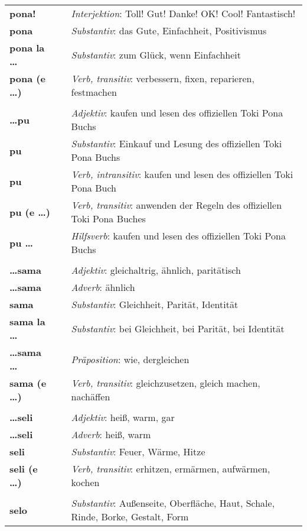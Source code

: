 \begin{supertabular}{p{2,5cm}|ll}
\textbf{pona!} && \textit{Interjektion}: Toll! Gut! Danke! OK! Cool! Fantastisch! \\ 
\textbf{pona} && \textit{Substantiv}: das Gute, Einfachheit, Positivismus \\ 
\textbf{pona la \dots} && \textit{Substantiv}: zum Glück, wenn Einfachheit \\ 
\textbf{pona (e \dots)} && \textit{Verb, transitiv}: verbessern, fixen, reparieren, festmachen \\ 
 && \\ %
\textbf{\dots pu} && \textit{Adjektiv}: kaufen und lesen des offiziellen Toki Pona Buchs \\ 
\textbf{pu} && \textit{Substantiv}: Einkauf und Lesung des offiziellen Toki Pona Buchs \\ 
\textbf{pu} && \textit{Verb, intransitiv}: kaufen und lesen des offiziellen Toki Pona Buch \\ 
\textbf{pu (e \dots)} && \textit{Verb, transitiv}: anwenden der Regeln des offiziellen Toki Pona Buches \\ 
\textbf{pu \dots} && \textit{Hilfsverb}: kaufen und lesen des offiziellen Toki Pona Buchs \\ 
 && \\ %
\textbf{\dots sama} && \textit{Adjektiv}: gleichaltrig, ähnlich, paritätisch \\ 
\textbf{\dots sama} && \textit{Adverb}: ähnlich \\ 
\textbf{sama} && \textit{Substantiv}: Gleichheit, Parität, Identität \\ 
\textbf{sama la \dots} && \textit{Substantiv}: bei Gleichheit, bei Parität, bei Identität  \\ 
\textbf{\dots sama \dots} && \textit{Präposition}: wie, dergleichen \\ 
\textbf{sama (e \dots)} && \textit{Verb, transitiv}: gleichzusetzen, gleich machen, nachäffen \\ 
 && \\ %
\textbf{\dots seli} && \textit{Adjektiv}: heiß, warm, gar \\ 
\textbf{\dots seli} && \textit{Adverb}: heiß, warm \\ 
\textbf{seli} && \textit{Substantiv}: Feuer, Wärme, Hitze \\ 
\textbf{seli (e \dots)} && \textit{Verb, transitiv}: erhitzen, ermärmen, aufwärmen, kochen \\ 
 && \\ %
\textbf{selo} && \textit{Substantiv}: Außenseite, Oberfläche, Haut, Schale, Rinde, Borke, Gestalt, Form \\ 

\end{supertabular}
